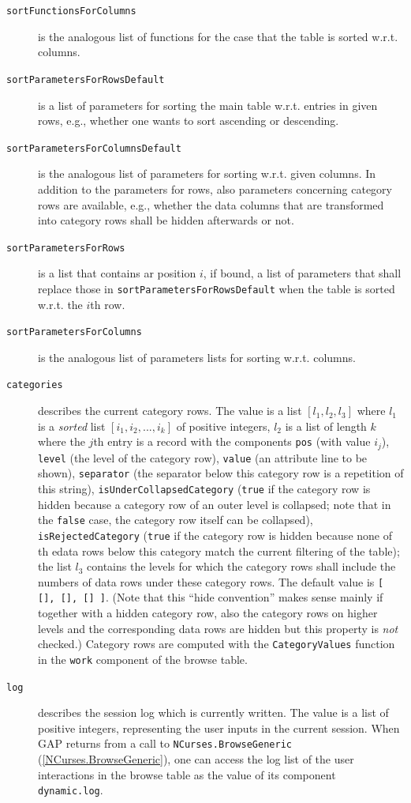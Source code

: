 \documentclass[a4paper,11pt]{report}
\begin{document}
{{{\begin{description}
\item[{\texttt{sortFunctionsForColumns}}]  is the analogous list of functions for the case that the table is sorted
w.r.t. columns. 
\item[{\texttt{sortParametersForRowsDefault}}]  is a list of parameters for sorting the main table w.r.t. entries in given
rows, e.{\nobreakspace}g., whether one wants to sort ascending or descending. 
\item[{\texttt{sortParametersForColumnsDefault}}]  is the analogous list of parameters for sorting w.r.t. given columns. In
addition to the parameters for rows, also parameters concerning category rows
are available, e.{\nobreakspace}g., whether the data columns that are
transformed into category rows shall be hidden afterwards or not. 
\item[{\texttt{sortParametersForRows}}]  is a list that contains ar position $i$, if bound, a list of parameters that shall replace those in \texttt{sortParametersForRowsDefault} when the table is sorted w.r.t. the $i$\texttt{}th row. 
\item[{\texttt{sortParametersForColumns}}]  is the analogous list of parameters lists for sorting w.r.t. columns. 
\item[{\texttt{categories}}]  describes the current category rows. The value is a list $[ l_1, l_2, l_3 ]$ where $l_1$ is a \emph{sorted} list $[ i_1, i_2, ..., i_k ]$ of positive integers, $l_2$ is a list of length $k$ where the $j$\texttt{}th entry is a record with the components \texttt{pos} (with value $i_j$), \texttt{level} (the level of the category row), \texttt{value} (an attribute line to be shown), \texttt{separator} (the separator below this category row is a repetition of this string), \texttt{isUnderCollapsedCategory} (\texttt{true} if the category row is hidden because a category row of an outer level is
collapsed; note that in the \texttt{false} case, the category row itself can be collapsed), \texttt{isRejectedCategory} (\texttt{true} if the category row is hidden because none of th edata rows below this
category match the current filtering of the table); the list $l_3$ contains the levels for which the category rows shall include the numbers of
data rows under these category rows. The default value is \texttt{[ [], [], [] ]}. (Note that this ``hide convention'' makes sense mainly if together with a hidden category row, also the category
rows on higher levels and the corresponding data rows are hidden
{\textendash}but this property is \emph{not} checked.) Category rows are computed with the \texttt{CategoryValues} function in the \texttt{work} component of the browse table. 
\item[{\texttt{log}}]  describes the session log which is currently written. The value is a list of
positive integers, representing the user inputs in the current session. When \textsf{GAP} returns from a call to \texttt{NCurses.BrowseGeneric} (\ref{NCurses.BrowseGeneric}), one can access the log list of the user interactions in the browse table as
the value of its component \texttt{dynamic.log}. 


\end{description}}}}
\end{document}

